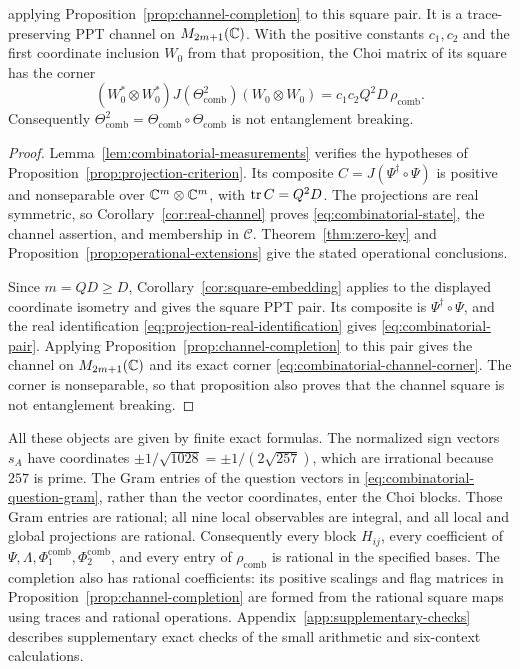 \begin{theorem}
\begin{enumerate}
       applying Proposition~\ref{prop:channel-completion} to this
       square pair.  It is a trace-preserving PPT channel on
       \(M_{2m+1}(\mathbb C)\).  With the positive constants \(c_1,c_2\)
       and the first coordinate inclusion \(W_0\) from that
       proposition, the Choi matrix of its square has the corner
       \begin{equation}\label{eq:combinatorial-channel-corner}
        (W_0^*\otimes W_0^*)J(\Theta_{\mathrm{comb}}^2)
        (W_0\otimes W_0)
        =c_1c_2Q^2D\,\rho_{\mathrm{comb}}.
       \end{equation}
       Consequently
       \(\Theta_{\mathrm{comb}}^2
         =\Theta_{\mathrm{comb}}\circ\Theta_{\mathrm{comb}}\)
       is not entanglement breaking.
\end{enumerate}
\end{theorem}

\begin{proof}
Lemma~\ref{lem:combinatorial-measurements} verifies the hypotheses of
Proposition~\ref{prop:projection-criterion}.  Its composite
\(C=J(\Psi^\dagger\circ\Psi)\) is positive and nonseparable over
\(\mathbb C^m\otimes\mathbb C^m\), with \(\operatorname{tr} C=Q^2D\).  The projections are real
symmetric, so Corollary~\ref{cor:real-channel} proves
\eqref{eq:combinatorial-state}, the channel assertion, and membership
in \(\mathscr C\).  Theorem~\ref{thm:zero-key} and
Proposition~\ref{prop:operational-extensions} give the stated
operational conclusions.

Since \(m=QD\geq D\), Corollary~\ref{cor:square-embedding} applies to
the displayed coordinate isometry and gives the square PPT pair.
Its composite is \(\Psi^\dagger\circ\Psi\), and the real
identification \eqref{eq:projection-real-identification} gives
\eqref{eq:combinatorial-pair}.  Applying
Proposition~\ref{prop:channel-completion} to this pair gives the
channel on \(M_{2m+1}(\mathbb C)\) and its exact corner
\eqref{eq:combinatorial-channel-corner}.  The corner is nonseparable,
so that proposition also proves that the channel square is not
entanglement breaking.
\end{proof}

All these objects are given by finite exact formulas.  The normalized
sign vectors \(s_A\) have coordinates
\(\pm1/\sqrt{1028}=\pm1/(2\sqrt{257})\), which are irrational because
\(257\) is prime.  The Gram entries of the question vectors in
\eqref{eq:combinatorial-question-gram}, rather than the vector coordinates,
enter the Choi blocks.  Those Gram entries are rational; all nine local
observables are integral, and all local and global projections are
rational.  Consequently every block \(H_{ij}\), every coefficient of
\(\Psi,\Lambda,\Phi_1^{\mathrm{comb}},\Phi_2^{\mathrm{comb}}\), and
every entry of \(\rho_{\mathrm{comb}}\) is rational in the specified
bases.  The completion also has rational coefficients: its positive
scalings and flag matrices in Proposition~\ref{prop:channel-completion}
are formed from the rational square maps using traces and rational
operations.  Appendix~\ref{app:supplementary-checks} describes
supplementary exact checks of the small arithmetic and six-context
calculations.
